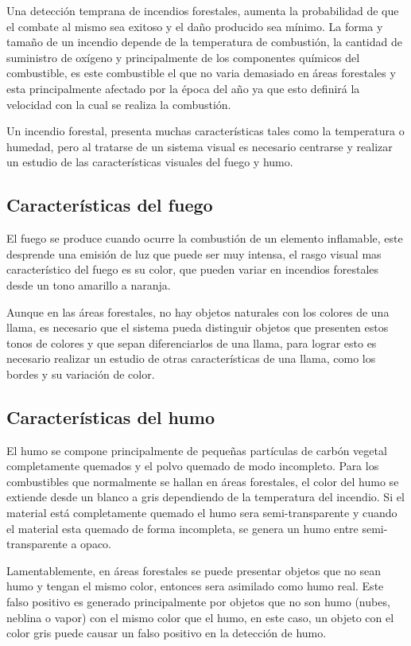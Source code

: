 Una detección temprana de incendios forestales, aumenta la probabilidad de que el combate al mismo sea exitoso y el daño producido sea mínimo. La forma y tamaño de un incendio depende de la temperatura de combustión, la cantidad de suministro de oxígeno y principalmente de los componentes químicos del combustible, es este combustible el que no varia demasiado en áreas forestales y esta principalmente afectado por la época del año ya que esto definirá la velocidad con la cual se realiza la combustión. 

Un incendio forestal, presenta muchas características tales como la temperatura o humedad, pero al tratarse de un sistema visual es necesario centrarse y realizar un estudio de las características visuales del fuego y humo.

\subsection{Características del fuego}

El fuego se produce cuando ocurre la combustión de un elemento inflamable, este desprende una emisión de luz que puede ser muy intensa, el rasgo visual mas característico del fuego es su color, que pueden variar en incendios forestales desde un tono amarillo a naranja.

Aunque en las áreas forestales, no hay objetos naturales con los colores de una llama, es necesario que el sistema pueda distinguir objetos que presenten estos tonos de colores y que sepan diferenciarlos de una llama, para lograr esto es necesario realizar un estudio de otras características de una llama, como los bordes y su variación de color.

\subsection{Características del humo}

El humo se compone principalmente de pequeñas partículas de carbón vegetal completamente quemados y el polvo quemado de modo incompleto. Para los combustibles que normalmente se hallan en áreas forestales, el color del humo se extiende desde un blanco a gris dependiendo de la temperatura del incendio. Si el material está completamente quemado el humo sera semi-transparente y cuando el material esta quemado de forma incompleta, se genera un humo entre semi-transparente a opaco.

Lamentablemente, en áreas forestales se puede presentar objetos que no sean humo y tengan el mismo color, entonces sera asimilado como humo real. Este falso positivo es generado principalmente por objetos que no son humo (nubes, neblina o vapor) con el mismo color que el humo, en este caso, un objeto con el color gris puede causar un falso positivo en la detección de humo. 

